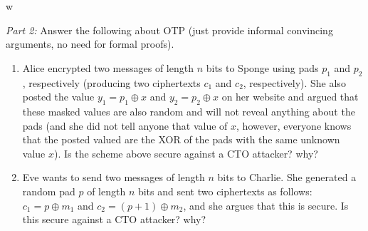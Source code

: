w\documentclass[12pt]{article}
\begin{document}
\noindent\emph{Part 2:} Answer the following about OTP (just provide informal convincing arguments, no need for formal proofs).
\begin{enumerate}
\item Alice encrypted two messages of length $n$ bits to Sponge using pads $p_1$ and $p_2$, respectively (producing two ciphertexts $c_1$ and $c_2$, respectively). She also posted the value $y_1 = p_1 \oplus x$ and $y_2 = p_2 \oplus x$ on her website and argued that these masked values are also random and will not reveal anything about the pads (and she did not tell anyone that value of $x$, however, everyone knows that the posted valued are the XOR of the pads with the same unknown value $x$). Is the scheme above secure against a CTO attacker? why?

\item Eve wants to send two messages of length $n$ bits to Charlie. She generated a random pad $p$ of length $n$ bits and sent two ciphertexts as follows: $c_1 = p \oplus m_1$ and $c_2 = (p+1) \oplus m_2$, and she argues that this is secure. Is this secure against a CTO attacker? why?
\end{enumerate}


\end{document}
